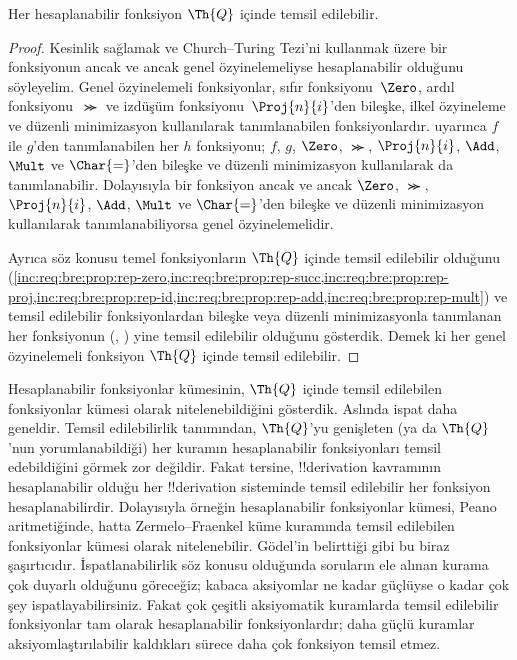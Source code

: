 \documentclass[../../../include/open-logic-section]{subfiles}
\begin{document}

\begin{thm}
Her hesaplanabilir fonksiyon $\Th{Q}$ içinde temsil edilebilir.
\end{thm}

\begin{proof}
Kesinlik sağlamak ve Church--Turing Tezi'ni kullanmak üzere bir fonksiyonun
ancak ve ancak genel özyinelemeliyse hesaplanabilir olduğunu söyleyelim.
Genel özyinelemeli fonksiyonlar, sıfır fonksiyonu~$\Zero$, ardıl
fonksiyonu~$\Succ$ ve izdüşüm fonksiyonu~$\Proj{n}{i}$'den bileşke, ilkel
özyineleme ve düzenli minimizasyon kullanılarak tanımlanabilen
fonksiyonlardır.  uyarınca $f$ ile $g$'den
tanımlanabilen her $h$ fonksiyonu; $f$, $g$, $\Zero$, $\Succ$,
$\Proj{n}{i}$, $\Add$, $\Mult$ ve $\Char{=}$'den bileşke ve düzenli
minimizasyon kullanılarak da tanımlanabilir. Dolayısıyla bir fonksiyon ancak
ve ancak $\Zero$, $\Succ$, $\Proj{n}{i}$, $\Add$, $\Mult$ ve $\Char{=}$'den
bileşke ve düzenli minimizasyon kullanılarak tanımlanabiliyorsa genel
özyinelemelidir.

Ayrıca söz konusu temel fonksiyonların $\Th{Q}$ içinde temsil edilebilir
olduğunu
(\cref{inc:req:bre:prop:rep-zero,inc:req:bre:prop:rep-succ,inc:req:bre:prop:rep-proj,inc:req:bre:prop:rep-id,inc:req:bre:prop:rep-add,inc:req:bre:prop:rep-mult})
ve temsil edilebilir fonksiyonlardan bileşke veya düzenli minimizasyonla
tanımlanan her fonksiyonun
(,
) yine temsil edilebilir olduğunu gösterdik.
Demek ki her genel özyinelemeli fonksiyon $\Th{Q}$ içinde temsil edilebilir.
\end{proof}

\begin{explain}
Hesaplanabilir fonksiyonlar kümesinin, $\Th{Q}$ içinde temsil edilebilen
fonksiyonlar kümesi olarak nitelenebildiğini gösterdik. Aslında ispat daha
geneldir. Temsil edilebilirlik tanımından, $\Th{Q}$'yu genişleten (ya da
$\Th{Q}$'nun yorumlanabildiği) her kuramın hesaplanabilir fonksiyonları temsil
edebildiğini görmek zor değildir. Fakat tersine, !!{derivation} kavramının
hesaplanabilir olduğu her !!{derivation} sisteminde temsil edilebilir her
fonksiyon hesaplanabilirdir. Dolayısıyla örneğin hesaplanabilir fonksiyonlar
kümesi, Peano aritmetiğinde, hatta Zermelo--Fraenkel küme kuramında temsil
edilebilen fonksiyonlar kümesi olarak nitelenebilir. G\"odel'in belirttiği
gibi bu biraz şaşırtıcıdır. İspatlanabilirlik söz konusu olduğunda soruların
ele alınan kurama çok duyarlı olduğunu göreceğiz; kabaca aksiyomlar ne kadar
güçlüyse o kadar çok şey ispatlayabilirsiniz. Fakat çok çeşitli aksiyomatik
kuramlarda temsil edilebilir fonksiyonlar tam olarak hesaplanabilir
fonksiyonlardır; daha güçlü kuramlar aksiyomlaştırılabilir kaldıkları sürece
daha çok fonksiyon temsil etmez.
\end{explain}
\end{document}
